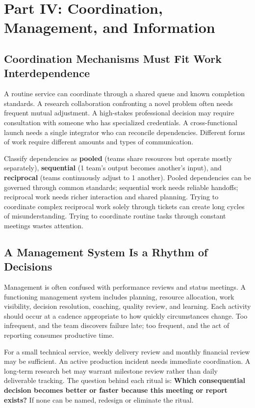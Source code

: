 \section*{Part IV: Coordination, Management, and Information}

\subsection{Coordination Mechanisms Must Fit Work Interdependence}
\label{sec:coordination_interdependence}

A routine service can coordinate through a shared queue and known completion standards. A research collaboration confronting a novel problem often needs frequent mutual adjustment. A high-stakes professional decision may require consultation with someone who has specialized credentials. A cross-functional launch needs a single integrator who can reconcile dependencies. Different forms of work require different amounts and types of communication.

Classify dependencies as \textbf{pooled} (teams share resources but operate mostly separately), \textbf{sequential} (1 team's output becomes another's input), and \textbf{reciprocal} (teams continuously adjust to 1 another). Pooled dependencies can be governed through common standards; sequential work needs reliable handoffs; reciprocal work needs richer interaction and shared planning. Trying to coordinate complex reciprocal work solely through tickets can create long cycles of misunderstanding. Trying to coordinate routine tasks through constant meetings wastes attention.

\subsection{A Management System Is a Rhythm of Decisions}
\label{sec:management_system_rhythm}

Management is often confused with performance reviews and status meetings. A functioning management system includes planning, resource allocation, work visibility, decision resolution, coaching, quality review, and learning. Each activity should occur at a cadence appropriate to how quickly circumstances change. Too infrequent, and the team discovers failure late; too frequent, and the act of reporting consumes productive time.

For a small technical service, weekly delivery review and monthly financial review may be sufficient. An active production incident needs immediate coordination. A long-term research bet may warrant milestone review rather than daily deliverable tracking. The question behind each ritual is: \textbf{Which consequential decision becomes better or faster because this meeting or report exists?} If none can be named, redesign or eliminate the ritual.

